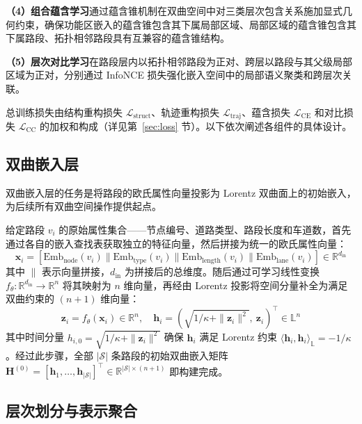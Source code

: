 \textbf{（4）组合蕴含学习}通过蕴含锥机制在双曲空间中对三类层次包含关系施加显式几何约束，确保功能区嵌入的蕴含锥包含其下属局部区域、局部区域的蕴含锥包含其下属路段、拓扑相邻路段具有互兼容的蕴含锥结构。

\textbf{（5）层次对比学习}在路段层内以拓扑相邻路段为正对、跨层以路段与其父级局部区域为正对，分别通过 InfoNCE 损失强化嵌入空间中的局部语义聚类和跨层次关联。

总训练损失由结构重构损失 $\mathcal{L}_{\text{struct}}$、轨迹重构损失 $\mathcal{L}_{\text{traj}}$、蕴含损失 $\mathcal{L}_{\text{CE}}$ 和对比损失 $\mathcal{L}_{\text{CC}}$ 的加权和构成（详见第~\ref{sec:loss} 节）。以下依次阐述各组件的具体设计。

\subsection{双曲嵌入层}

双曲嵌入层的任务是将路段的欧氏属性向量投影为 Lorentz 双曲面上的初始嵌入，为后续所有双曲空间操作提供起点。

给定路段 $v_i$ 的原始属性集合——节点编号、道路类型、路段长度和车道数，首先通过各自的嵌入查找表获取独立的特征向量，然后拼接为统一的欧氏属性向量：
\begin{equation}
    \mathbf{x}_i = [\mathrm{Emb}_{\text{node}}(v_i) \| \mathrm{Emb}_{\text{type}}(v_i) \| \mathrm{Emb}_{\text{length}}(v_i) \| \mathrm{Emb}_{\text{lane}}(v_i)] \in \mathbb{R}^{d_{\text{in}}}
\end{equation}
其中 $\|$ 表示向量拼接，$d_{\text{in}}$ 为拼接后的总维度。随后通过可学习线性变换 $f_\theta: \mathbb{R}^{d_{\text{in}}} \to \mathbb{R}^n$ 将其映射为 $n$ 维向量，再经由 Lorentz 投影将空间分量补全为满足双曲约束的 $(n+1)$ 维向量：
\begin{equation}
    \mathbf{z}_i = f_\theta(\mathbf{x}_i) \in \mathbb{R}^n, \quad \mathbf{h}_i = \left(\sqrt{1/\kappa + \|\mathbf{z}_i\|^2},\ \mathbf{z}_i\right)^\top \in \mathbb{L}^n
\end{equation}
其中时间分量 $h_{i,0} = \sqrt{1/\kappa + \|\mathbf{z}_i\|^2}$ 确保 $\mathbf{h}_i$ 满足 Lorentz 约束 $\langle \mathbf{h}_i, \mathbf{h}_i \rangle_{\mathbb{L}} = -1/\kappa$。经过此步骤，全部 $|\mathcal{S}|$ 条路段的初始双曲嵌入矩阵 $\mathbf{H}^{(0)} = [\mathbf{h}_1, \ldots, \mathbf{h}_{|\mathcal{S}|}]^\top \in \mathbb{R}^{|\mathcal{S}| \times (n+1)}$ 即构建完成。

\subsection{层次划分与表示聚合}

